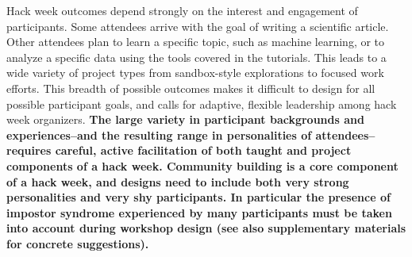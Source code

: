 Hack week outcomes depend strongly on the interest and engagement of participants.
Some attendees arrive with the goal of writing a scientific article.
Other attendees plan to learn a specific topic, such as machine learning, or to analyze a specific data using the tools covered in the tutorials.
This leads to a wide variety of project types from sandbox-style explorations to focused work efforts.
This breadth of possible outcomes makes it difficult to design for all possible participant goals, and calls for adaptive, flexible leadership among hack week organizers.
\textbf{The large variety in participant backgrounds and experiences--and the resulting range in personalities of attendees--requires careful, active facilitation of both taught and project components of a hack week. Community building is a core component of a hack week, and designs need to include both very strong personalities and very shy participants. In particular the presence of impostor syndrome experienced by many participants must be taken into account during workshop design (see also supplementary materials for concrete suggestions).}
